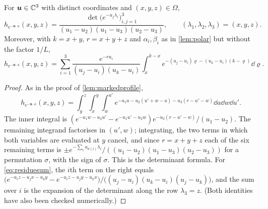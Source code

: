 \documentclass[11pt,colorlinks]{charlie}
\newcommand{\Om}{\Omega}
\begin{document}
\begin{lemma}\label{lem:expprofile}
For $\boldsymbol u\in\mathbb{C}^3$ with distinct coordinates and $(x,y,z)\in\Om$,
\[
 h_{e^{-\boldsymbol u\cdot a}}(x,y,z)=\frac{\det\big(e^{-u_j\lambda_i}\big)_{i,j=1}^3}{(u_1-u_2)(u_1-u_3)(u_2-u_3)},\qquad(\lambda_1,\lambda_2,\lambda_3)=(x,y,z).
\]
Moreover, with $k=x+y$, $r=x+y+z$ and $\alpha_i,\beta_i$ as in \cref{lem:polar} but without the factor $1/L$,
\begin{equation}\label{eq:residuesum}
 h_{e^{-\boldsymbol u\cdot a}}(x,y,z)=\sum_{i=1}^3\frac{e^{-ru_i}}{(u_j-u_i)(u_k-u_i)}\int_x^{k-x}e^{-(u_j-u_i)\varrho-(u_k-u_i)(k-\varrho)}\dd\varrho .
\end{equation}
\end{lemma}
\begin{proof}
As in the proof of \cref{lem:markedprofile},
\[
 h_{e^{-\boldsymbol u\cdot a}}(x,y,z)=\int_y^z\!\!\int_x^y\!\!\int_w^{u'}e^{-u_1a-u_2(u'+w-a)-u_3(r-u'-w)}\dd a\dd w\dd u' .
\]
The inner integral is $(e^{-u_1w-u_2u'}-e^{-u_1u'-u_2w})e^{-u_3(r-u'-w)}/(u_1-u_2)$. The remaining integrand factorises in $(u',w)$; integrating, the two terms in which both variables are evaluated at $y$ cancel, and since $r=x+y+z$ each of the six remaining terms is $\pm e^{-\sum_iu_{\sigma(i)}\lambda_i}/((u_1-u_2)(u_1-u_3)(u_2-u_3))$ for a permutation $\sigma$, with the sign of $\sigma$. This is the determinant formula. For \eqref{eq:residuesum}, the $i$th term on the right equals $\big(e^{-u_iz-u_jx-u_ky}-e^{-u_iz-u_jy-u_kx}\big)/\big((u_j-u_i)(u_k-u_i)(u_j-u_k)\big)$, and the sum over $i$ is the expansion of the determinant along the row $\lambda_3=z$. (Both identities have also been checked numerically.)
\end{proof}
\end{document}

